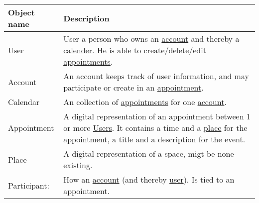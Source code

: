 {\tabulinesep=1.2mm
\begin{tabu}{ | p{3cm} | p{13cm} |}\hline
    Object name 			& 		Description\\\hline
    User  					& 		User a person who owns an \uline{account} and thereby a \uline{calender}. He is able to create/delete/edit \uline{appointments}. \\\hline
    Account 				& 		An account keeps track of user information, and may participate or create in an \uline{appointment}. \\\hline
	Calendar				&		An collection of \uline{appointments} for one \uline{account}.\\ \hline
	Appointment				&		A digital representation of an appointment between 1 or more \uline{Users}. It contains a time and a \uline{place} for the appointment, a title and a description for the event.\\\hline
    Place 					& 		A digital representation of a space, migt be none-existing.\\\hline
	Participant: 			&		How an \uline{account} (and thereby \uline{user}). Is tied to an appointment.\\\hline
\end{tabu}
}
